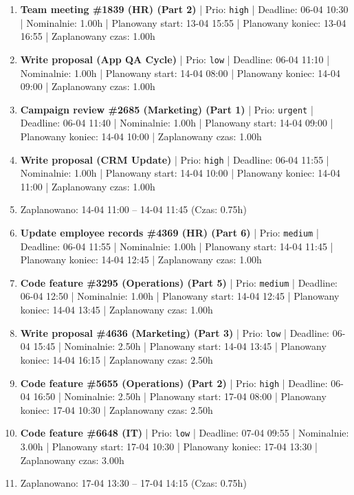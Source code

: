 {\begin{enumerate}
  \item [\textbf{14610}] \textbf{Team meeting \#1839 (HR) (Part 2)} | Prio: \texttt{high} | Deadline: 06-04 10:30 | Nominalnie: 1.00h | Planowany start: 13-04 15:55 | Planowany koniec: 13-04 16:55 | Zaplanowany czas: 1.00h
  \item [\textbf{14695}] \textbf{Write proposal (App QA Cycle)} | Prio: \texttt{low} | Deadline: 06-04 11:10 | Nominalnie: 1.00h | Planowany start: 14-04 08:00 | Planowany koniec: 14-04 09:00 | Zaplanowany czas: 1.00h
  \item [\textbf{14607}] \textbf{Campaign review \#2685 (Marketing) (Part 1)} | Prio: \texttt{urgent} | Deadline: 06-04 11:40 | Nominalnie: 1.00h | Planowany start: 14-04 09:00 | Planowany koniec: 14-04 10:00 | Zaplanowany czas: 1.00h
  \item [\textbf{14629}] \textbf{Write proposal (CRM Update)} | Prio: \texttt{high} | Deadline: 06-04 11:55 | Nominalnie: 1.00h | Planowany start: 14-04 10:00 | Planowany koniec: 14-04 11:00 | Zaplanowany czas: 1.00h
  \item [\textbf{PRZERWA}] Zaplanowano: 14-04 11:00 -- 14-04 11:45 (Czas: 0.75h)
  \item [\textbf{14658}] \textbf{Update employee records \#4369 (HR) (Part 6)} | Prio: \texttt{medium} | Deadline: 06-04 11:55 | Nominalnie: 1.00h | Planowany start: 14-04 11:45 | Planowany koniec: 14-04 12:45 | Zaplanowany czas: 1.00h
  \item [\textbf{14645}] \textbf{Code feature \#3295 (Operations) (Part 5)} | Prio: \texttt{medium} | Deadline: 06-04 12:50 | Nominalnie: 1.00h | Planowany start: 14-04 12:45 | Planowany koniec: 14-04 13:45 | Zaplanowany czas: 1.00h
  \item [\textbf{14684}] \textbf{Write proposal \#4636 (Marketing) (Part 3)} | Prio: \texttt{low} | Deadline: 06-04 15:45 | Nominalnie: 2.50h | Planowany start: 14-04 13:45 | Planowany koniec: 14-04 16:15 | Zaplanowany czas: 2.50h
  \item [\textbf{14626}] \textbf{Code feature \#5655 (Operations) (Part 2)} | Prio: \texttt{high} | Deadline: 06-04 16:50 | Nominalnie: 2.50h | Planowany start: 17-04 08:00 | Planowany koniec: 17-04 10:30 | Zaplanowany czas: 2.50h
  \item [\textbf{14683}] \textbf{Code feature \#6648 (IT)} | Prio: \texttt{low} | Deadline: 07-04 09:55 | Nominalnie: 3.00h | Planowany start: 17-04 10:30 | Planowany koniec: 17-04 13:30 | Zaplanowany czas: 3.00h
  \item [\textbf{PRZERWA}] Zaplanowano: 17-04 13:30 -- 17-04 14:15 (Czas: 0.75h)

\end{enumerate}}
